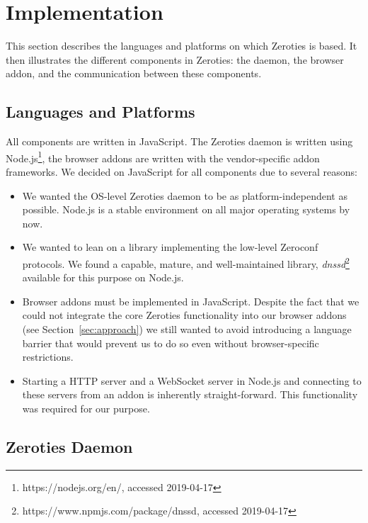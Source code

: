 \section{Implementation}
\label{sec:implementation}

This section describes the languages and platforms on which Zeroties is based.
It then illustrates the different components in Zeroties: the daemon, the browser addon, and the communication between these components.

\subsection{Languages and Platforms}
\label{sub:languages_and_platforms}

All components are written in JavaScript. 
The Zeroties daemon is written using Node.js\footnote{https://nodejs.org/en/, accessed 2019-04-17}, the browser addons are written with the vendor-specific addon frameworks.
We decided on JavaScript for all components due to several reasons:
\begin{itemize}
\item We wanted the OS-level Zeroties daemon to be as platform-independent as possible. 
Node.js is a stable environment on all major operating systems by now.
\item We wanted to lean on a library implementing the low-level Zeroconf protocols.
We found a capable, mature, and well-maintained library, \textit{dnssd}\footnote{https://www.npmjs.com/package/dnssd, accessed 2019-04-17} available for this purpose on Node.js.
\item Browser addons must be implemented in JavaScript.
Despite the fact that we could not integrate the core Zeroties functionality into our browser addons (see Section~\ref{sec:approach}) we still wanted to avoid  introducing a language barrier that would prevent us to do so even without browser-specific restrictions.
\item Starting a HTTP server and a WebSocket server in Node.js and connecting to these servers from an addon is inherently straight-forward.
This functionality was required for our purpose.
\end{itemize}

\subsection{Zeroties Daemon}
\label{sub:zeroties_daemon}

